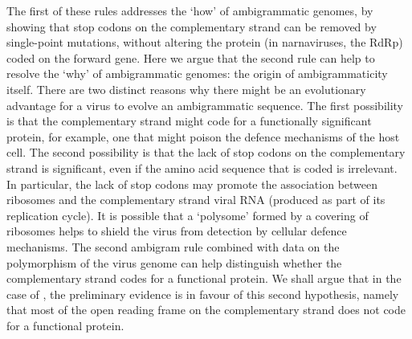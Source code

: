 \documentclass[unnumsec,webpdf,contemporary,large,namedate]{oup-authoring-template}%
\theoremstyle{thmstyleone}%
\theoremstyle{thmstyletwo}%
\theoremstyle{thmstylethree}%
\begin{document}
The first of these rules addresses the \lq how' of  ambigrammatic genomes, by showing that 
stop codons on the complementary strand can be removed by single-point mutations, without 
altering the protein (in narnaviruses, the RdRp) coded on the forward gene. Here we argue that the 
second rule can help to resolve the \lq why' of ambigrammatic genomes: 
the origin of ambigrammaticity itself. There are two 
distinct reasons why there might be an evolutionary advantage for a virus to evolve an 
ambigrammatic sequence. The first possibility is that the complementary strand might code 
for a functionally significant protein, for example, one that might poison the defence mechanisms 
of the host cell. The second possibility is that the lack of stop codons on the complementary strand 
is significant, even if the amino acid sequence that is coded is irrelevant. In particular, the lack of stop codons 
may promote the association between ribosomes and the complementary strand viral RNA (produced as part of its 
replication cycle). It is possible that a \lq polysome' formed by a covering of ribosomes helps to shield 
the virus from  detection by cellular defence mechanisms. The second ambigram rule combined
with data on the polymorphism of the 
virus genome can help distinguish whether the complementary strand codes for a functional protein. 
We shall argue that in the case of , the preliminary evidence is in favour of this 
second hypothesis, namely that most of the open reading frame on the complementary strand does 
not code for a functional protein.
\end{document}

